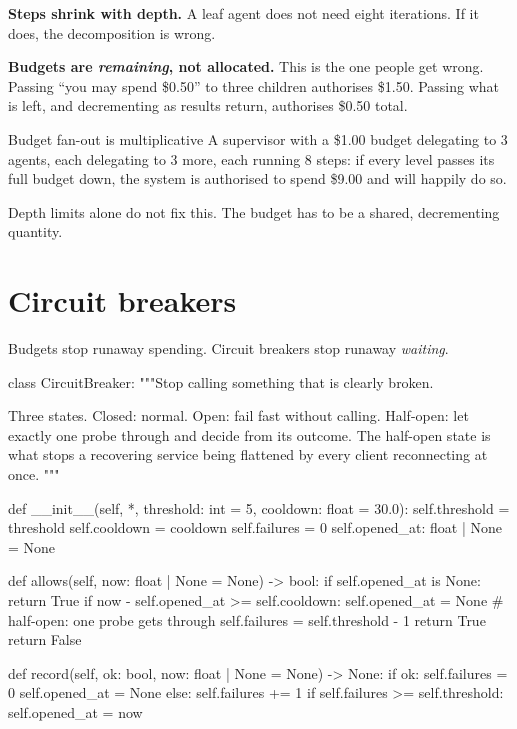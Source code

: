 \textbf{Steps shrink with depth.} A leaf agent does not need eight iterations. If
it does, the decomposition is wrong.

\textbf{Budgets are \emph{remaining}, not allocated.} This is the one people get
wrong. Passing ``you may spend \$0.50'' to three children authorises \$1.50.
Passing what is left, and decrementing as results return, authorises \$0.50
total.

\begin{dangerbox}{Budget fan-out is multiplicative}
A supervisor with a \$1.00 budget delegating to 3 agents, each delegating to 3
more, each running 8 steps: if every level passes its full budget down, the
system is authorised to spend \$9.00 and will happily do so.

Depth limits alone do not fix this. The budget has to be a shared, decrementing quantity.
\end{dangerbox}

\section{Circuit breakers}

Budgets stop runaway spending. Circuit breakers stop runaway \emph{waiting}.

\begin{py}
class CircuitBreaker:
    """Stop calling something that is clearly broken.

    Three states. Closed: normal. Open: fail fast without calling. Half-open:
    let exactly one probe through and decide from its outcome. The half-open
    state is what stops a recovering service being flattened by every client
    reconnecting at once.
    """

    def __init__(self, *, threshold: int = 5, cooldown: float = 30.0):
        self.threshold = threshold
        self.cooldown = cooldown
        self.failures = 0
        self.opened_at: float | None = None

    def allows(self, now: float | None = None) -> bool:
        if self.opened_at is None:
            return True
        if now - self.opened_at >= self.cooldown:
            self.opened_at = None      # half-open: one probe gets through
            self.failures = self.threshold - 1
            return True
        return False

    def record(self, ok: bool, now: float | None = None) -> None:
        if ok:
            self.failures = 0
            self.opened_at = None
        else:
            self.failures += 1
            if self.failures >= self.threshold:
                self.opened_at = now
\end{py}


